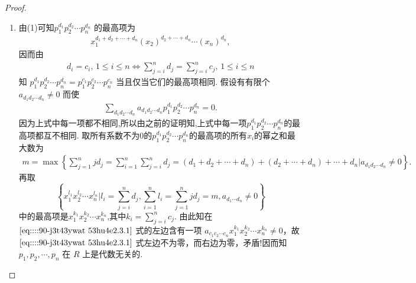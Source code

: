 \documentclass[../../main.tex]{subfiles}%
\begin{document}
\begin{proof}
\begin{enumerate}[(1)]
\item 由(1)可知\( p_1^{d_1} p_2^{d_2} \cdots p_n^{d_n} \) 的最高项为
\begin{align*}
x_1^{d_1 + d_2 + \cdots + d_n} (x_2)^{d_2 + \cdots + d_n} \cdots (x_n)^{d_n},
\end{align*}
因而由
\begin{align*}
d_i = c_i, \, 1 \leqslant i \leqslant n \iff \sum_{j=i}^n d_j = \sum_{j=i}^n c_j, \, 1 \leqslant i \leqslant n
\end{align*}
知 \( p_1^{d_1} p_2^{d_2} \cdots p_n^{d_n} = p_1^{c_1} p_2^{c_2} \cdots p_n^{c_n} \) 当且仅当它们的最高项相同. 假设有有限个\( a_{d_1 d_2 \cdots d_n} \neq 0 \) 而使
\begin{align}
\sum_{d_1 d_2 \cdots d_n} a_{d_1 d_2 \cdots d_n} p_1^{d_1} p_2^{d_2} \cdots p_n^{d_n} = 0. \label{eq::::90-j3t43ywat 53hu4e2.3.1}
\end{align}
因为上式中每一项都不相同,所以由之前的证明知,上式中每一项$p_{1}^{d_1}p_{2}^{d_2}\cdots p_{n}^{d_n}$的最高项都互不相同.
取所有系数不为0的$p_{1}^{d_1}p_{2}^{d_2}\cdots p_{n}^{d_n}$的最高项的所有$x_i$的幂之和最大数为
\begin{align*}
m=\max \left\{ \sum_{j=1}^n{jd_j}=\sum_{i=1}^n{\sum_{j=i}^n{d_j}}=\left( d_1+d_2+\cdots +d_n \right) +\left( d_2+\cdots +d_n \right) +\cdots +d_n\biggl| a_{d_1d_2\cdots d_n}\ne 0 \right\} .
\end{align*}
再取
\[
\left\{ x_1^{l_1} x_2^{l_2} \cdots x_n^{l_n} \bigg| l_i = \sum_{j=i}^n d_j, \sum_{i=1}^n l_i =\sum_{j=1}^n{jd_j}= m ,a_{d_1\cdots d_n}\ne 0\right\}
\]
中的最高项是\( x_1^{k_1} x_2^{k_2} \cdots x_n^{k_n} \),其中\( k_i = \sum_{j=i}^n c_j \).
由此知在 \(\eqref{eq::::90-j3t43ywat 53hu4e2.3.1}\) 式的左边含有一项 \( a_{c_1 c_2 \cdots c_n} x_1^{k_1} x_2^{k_2} \cdots x_n^{k_n}\ne 0 \)，故\(\eqref{eq::::90-j3t43ywat 53hu4e2.3.1}\) 式左边不为零，而右边为零，矛盾!因而知 \( p_1, p_2, \cdots, p_n \) 在 \( R \) 上是代数无关的.
\end{enumerate}
\end{proof}
\end{document}
